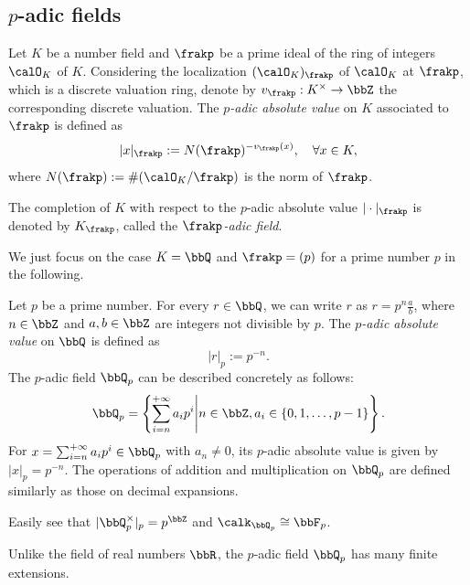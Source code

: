 
\subsection[p-adic fields]{\(p\)-adic fields}

    \begin{construction}\label{constr:p-adic_absolute_value_on_number_field}
        Let \(K\) be a number field and \(\frakp\) be a prime ideal of the ring of integers \(\calO_K\) of \(K\).
        Considering the localization \((\calO_K)_\frakp\) of \(\calO_K\) at \(\frakp\), which is a discrete valuation ring, denote by \(v_\frakp: K^\times \to \bbZ\) the corresponding discrete valuation.
        The \emph{\(p\)-adic absolute value} on \(K\) associated to \(\frakp\) is defined as
        \[ |x|_\frakp := N(\frakp)^{-v_\frakp(x)},\quad\forall x \in K, \]
        where \(N(\frakp) := \#(\calO_K / \frakp)\) is the norm of \(\frakp\).

        The completion of \(K\) with respect to the \(p\)-adic absolute value \(|\cdot|_\frakp\) is denoted by \(K_\frakp\), called the \emph{\(\frakp\)-adic field}.
    \end{construction}

    We just focus on the case \(K = \bbQ\) and \(\frakp = (p)\) for a prime number \(p\) in the following.

    \begin{example}\label{eg:p-adic_field}
        Let \(p\) be a prime number. 
        For every \(r \in \bbQ\), we can write \(r\) as \(r = p^n \frac{a}{b}\), where \(n \in \bbZ\) and \(a,b \in \bbZ\) are integers not divisible by \(p\).
        The \emph{\(p\)-adic absolute value} on \(\bbQ\) is defined as
        \[ |r|_p := p^{-n}. \]
        The \(p\)-adic field \(\bbQ_p\) can be described concretely as follows:
        \[ \bbQ_p = \left\{ \sum_{i = n}^{+\infty} a_i p^i \middle| n \in \bbZ, a_i \in \{0, 1, \ldots, p-1\} \right\}. \]
        For \(x = \sum_{i = n}^{+\infty} a_i p^i \in \bbQ_p\) with \(a_n \neq 0\), its \(p\)-adic absolute value is given by \(|x|_p = p^{-n}\).
        The operations of addition and multiplication on \(\bbQ_p\) are defined similarly as those on decimal expansions.
    \end{example}

    Easily see that \(|\bbQ_p^\times|_p = p^\bbZ\) and \(\calk_{\bbQ_p} \cong \bbF_p\).

    Unlike the field of real numbers \(\bbR\), the \(p\)-adic field \(\bbQ_p\) has many finite extensions.

